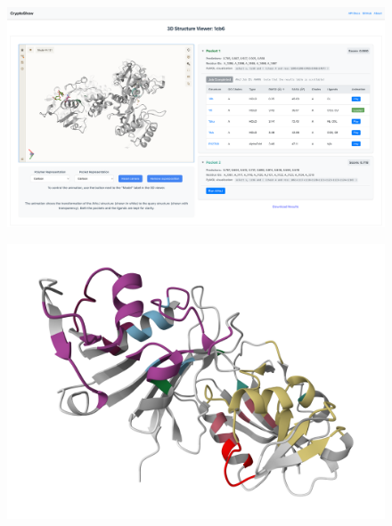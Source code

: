 \documentclass[aspectratio=169]{beamer}
\begin{document}
\begin{frame}
  \begin{figure}
    \centering
    \includegraphics[width=\linewidth,height=\textheight,keepaspectratio]{fig/screen2.png}
  \end{figure}

\end{frame}

\begin{frame}
  \begin{figure}
    \centering
    \includegraphics[width=\linewidth,height=\textheight,keepaspectratio]{fig/screen3.png}
  \end{figure}

\end{frame}
\end{document}
